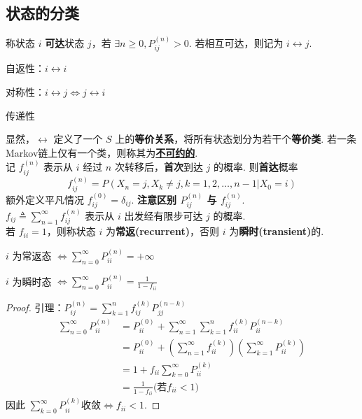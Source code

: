 \documentclass[./main.tex]{subfiles}
\begin{document}
\subsection{状态的分类}
称状态 $i$ \textbf{可达}状态 $j$，若 $\exists n\ge 0,P_{ij}^{(n)}>0$. 若相互可达，则记为 $i\leftrightarrow j$. 
\begin{enumerate*}
    \item 自返性：$i\leftrightarrow i$
    \item 对称性：$i\leftrightarrow j\iff j\leftrightarrow i$
    \item 传递性
\end{enumerate*}
显然，$\leftrightarrow$ 定义了一个 $S$ 上的\textbf{等价关系}，将所有状态划分为若干个\textbf{等价类}. 若一条Markov链上仅有一个类，则称其为\underline{\textbf{不可约的}}. \\
记 $f_{ij}^{(n)}$ 表示从 $i$ 经过 $n$ 次转移后，\textbf{\color{red}首次}到达 $j$ 的概率. 则\textbf{首达}概率
\begin{equation*}
    f_{ij}^{(n)}=P(X_n=j,X_k\neq j,k=1,2,\dots,n-1|X_0=i)
\end{equation*}
额外定义平凡情况 $f_{ij}^{(0)}=\delta_{ij}$. \textbf{\color{red}注意区别 $P_{ij}^{(n)}$ 与 $f_{ij}^{(n)}$}. \\
$f_{ij}\triangleq\sum_{n=1}^{\infty}f_{ij}^{(n)}$ 表示从 $i$ 出发经有限步可达 $j$ 的概率. \\
若 $f_{ii}=1$，则称状态 $i$ 为\textbf{常返(recurrent)}，否则 $i$ 为\textbf{瞬时(transient)}的. \\
\vspace{-0.7em}
\begin{itemize*}
    \item $i$ 为常返态 $\iff \sum_{n=0}^{\infty}P_{ii}^{(n)}=+\infty$
    \item $i$ 为瞬时态 $\iff\sum_{n=0}^{\infty}P_{ii}^{(n)}=\frac{1}{1-f_{ii}}$
\end{itemize*}
\begin{proof}
    引理：$P_{ij}^{(n)}=\sum_{k=1}^{n}f_{ij}^{(k)}P_{jj}^{(n-k)
}$
\begin{align*}
    \sum_{n=0}^{\infty}P_{ii}^{(n)}&=P_{ii}^{(0)}+\sum_{n=1}^{\infty}\sum_{k=1}^{n}f_{ii}^{(k)}P_{ii}^{(n-k)}\\
    &=P_{ii}^{(0)}+\left(\sum_{n=1}^{\infty}f_{ii}^{(k)}\right) \left(\sum_{k=1}^{\infty}P_{ii}^{(k)}\right)\\
    &=1+f_{ii}\sum_{k=0}^{\infty}P_{ii}^{(k)}\\
    &=\frac{1}{1-f_{ii}}\text{(若$f_{ii}<1$)}
\end{align*}
因此 $\sum_{k=0}^{\infty}P_{ii}^{(k)}\text{收敛}\iff f_{ii}<1$. 
\end{proof}
\end{document}
